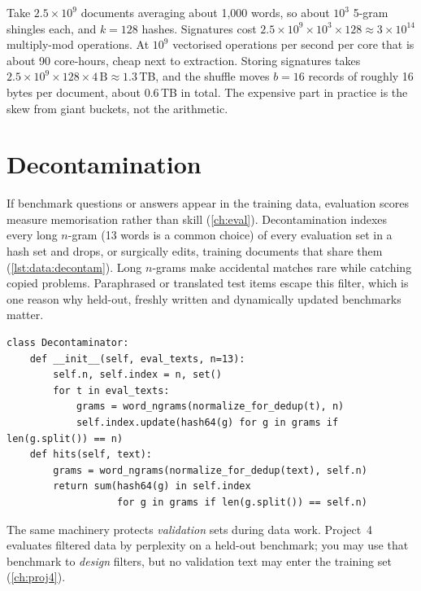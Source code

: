 \begin{napkinmath}
Take $2.5\times10^{9}$ documents averaging about 1{,}000 words, so about $10^{3}$ 5-gram
shingles each, and $k=128$ hashes. Signatures cost $2.5\times10^9\times10^3\times128\approx3\times10^{14}$
multiply-mod operations. At $10^{9}$ vectorised operations per second per core that is about
90 core-hours, cheap next to extraction. Storing signatures takes
$2.5\times10^{9}\times128\times4\,\text{B}\approx1.3$\,TB, and the shuffle moves $b=16$ records of
roughly 16 bytes per document, about 0.6\,TB in total. The expensive part in practice is the skew
from giant buckets, not the arithmetic.
\end{napkinmath}

\section{Decontamination}\label{sec:data:decontam}

If benchmark questions or answers appear in the training data, evaluation scores measure
memorisation rather than skill (\cref{ch:eval}). Decontamination indexes every long $n$-gram (13
words is a common choice) of every evaluation set in a hash set and drops, or surgically edits,
training documents that share them (\cref{lst:data:decontam}). Long $n$-grams make accidental
matches rare while catching copied problems. Paraphrased or translated test items escape
this filter, which is one reason why held-out, freshly written and dynamically updated
benchmarks matter.

\begin{lstlisting}[caption={Long-$n$-gram decontamination (from \code{llmsys/datapipe/decontam.py}).},label={lst:data:decontam}]
class Decontaminator:
    def __init__(self, eval_texts, n=13):
        self.n, self.index = n, set()
        for t in eval_texts:
            grams = word_ngrams(normalize_for_dedup(t), n)
            self.index.update(hash64(g) for g in grams if len(g.split()) == n)
    def hits(self, text):
        grams = word_ngrams(normalize_for_dedup(text), self.n)
        return sum(hash64(g) in self.index
                   for g in grams if len(g.split()) == self.n)
\end{lstlisting}

The same machinery protects \emph{validation} sets during data work. Project~4
evaluates filtered data by perplexity on a held-out benchmark; you may use that benchmark to
\emph{design} filters, but no validation text may enter the training set
(\cref{ch:proj4}).

